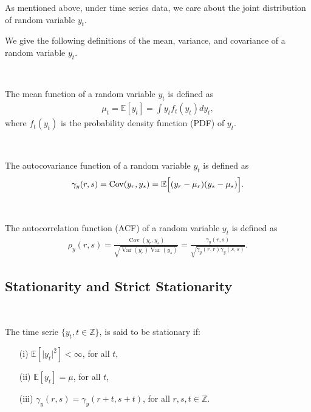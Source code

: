 As mentioned above, under time series data, we care about the joint distribution of random variable $y_t$.

We give the following definitions of the mean, variance, and covariance of a random variable $y_t$.
\begin{definition}\label{def:mean-function}
    \

    The mean function of a random variable $y_t$ is defined as
    \begin{gather*}
        \mu_t = \mathbb{E}[y_t] = \int y_t f_{t}(y_t) d y_t,
    \end{gather*}
    where $f_{t}(y_t)$ is the probability density function (PDF) of $y_t$.
\end{definition}

\begin{definition}\label{def:autocovariance-function}
    \

    The autocovariance function of a random variable $y_t$ is defined as
    \begin{gather*}
        \gamma_{y}(r,s) = \operatorname{Cov}(y_r, y_s) = \mathbb{E}\Bigl[ (y_r - \mu_r)(y_s - \mu_s) \Bigr].
    \end{gather*}    
\end{definition}

\begin{definition}\label{def:autocorrelation-function}
    \

    The autocorrelation function (ACF) of a random variable $y_t$ is defined as
    \begin{gather*}
        \rho_{y}(r,s) = \frac{\operatorname{Cov}(y_r, y_s)}{\sqrt{\operatorname{Var}(y_r) \operatorname{Var}(y_s)}} = \frac{\gamma_{y}(r,s)}{\sqrt{\gamma_{y}(r,r) \gamma_{y}(s,s)}}.
    \end{gather*}
    
\end{definition}

\subsection{Stationarity and Strict Stationarity}

\begin{definition}[Stationarity]\label{def:weak-stationarity}
    \

    The time serie $\{y_t, t \in \mathbb{Z}\}$, is said to be stationary if:
    \begin{enumerate}
        \item[(i)] $\mathbb{E}[\vert y_t \vert ^2] < \infty$, for all $t$,
        \item[(ii)] $\mathbb{E}[y_t] = \mu $, for all $t$,
        \item[(iii)] $\gamma_y(r,s) = \gamma_y(r+t, s+t)$, for all $r,s,t \in \mathbb{Z}$. 
    \end{enumerate}
\end{definition}

